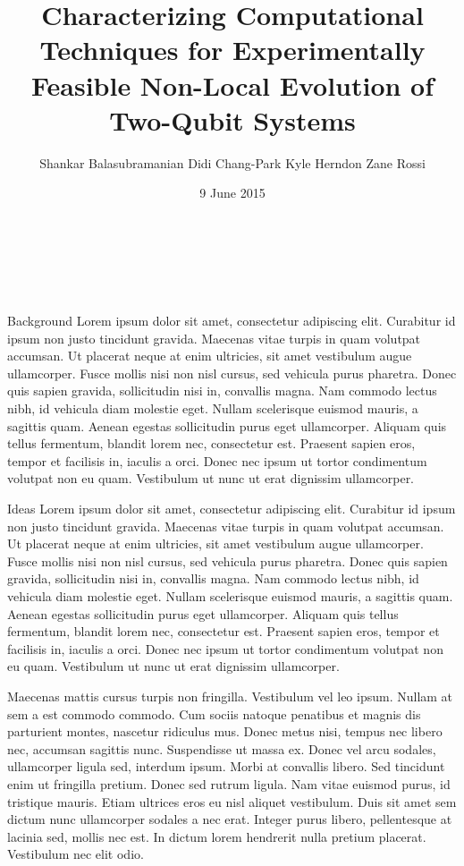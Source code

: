 \documentclass[12pt]{beamer}
\title{Characterizing Computational Techniques for Experimentally Feasible Non-Local Evolution of Two-Qubit Systems}
\author{Shankar Balasubramanian\hspace{1em} Didi Chang-Park\hspace{1em} Kyle Herndon\hspace{1em} Zane Rossi}
\institute{TJHSST Modern Physics and Optics Lab}
\date{9 June 2015}
\renewcommand{\maketitle}{%
	\begin{center}%
		\Huge\inserttitle\\[5mm]%
		\Large\insertauthor\\[5mm]%
		\Large\insertinstitute%
	\end{center}%
	\vspace*{-1ex}%
}
\begin{document}
\centering
	\begin{frame}{\maketitle}
		\begin{columns}
			\begin{column}{.45\textwidth}
				\begin{exampleblock}{Background}
					Lorem ipsum dolor sit amet, consectetur adipiscing elit. Curabitur id ipsum non justo tincidunt gravida. Maecenas vitae turpis in quam volutpat accumsan. Ut placerat neque at enim ultricies, sit amet vestibulum augue ullamcorper. Fusce mollis nisi non nisl cursus, sed vehicula purus pharetra. Donec quis sapien gravida, sollicitudin nisi in, convallis magna. Nam commodo lectus nibh, id vehicula diam molestie eget. Nullam scelerisque euismod mauris, a sagittis quam. Aenean egestas sollicitudin purus eget ullamcorper. Aliquam quis tellus fermentum, blandit lorem nec, consectetur est. Praesent sapien eros, tempor et facilisis in, iaculis a orci. Donec nec ipsum ut tortor condimentum volutpat non eu quam. Vestibulum ut nunc ut erat dignissim ullamcorper.
				\end{exampleblock}
				\vspace{1em}
				\begin{block}{Ideas}
					Lorem ipsum dolor sit amet, consectetur adipiscing elit. Curabitur id ipsum non justo tincidunt gravida. Maecenas vitae turpis in quam volutpat accumsan. Ut placerat neque at enim ultricies, sit amet vestibulum augue ullamcorper. Fusce mollis nisi non nisl cursus, sed vehicula purus pharetra. Donec quis sapien gravida, sollicitudin nisi in, convallis magna. Nam commodo lectus nibh, id vehicula diam molestie eget. Nullam scelerisque euismod mauris, a sagittis quam. Aenean egestas sollicitudin purus eget ullamcorper. Aliquam quis tellus fermentum, blandit lorem nec, consectetur est. Praesent sapien eros, tempor et facilisis in, iaculis a orci. Donec nec ipsum ut tortor condimentum volutpat non eu quam. Vestibulum ut nunc ut erat dignissim ullamcorper.

					Maecenas mattis cursus turpis non fringilla. Vestibulum vel leo ipsum. Nullam at sem a est commodo commodo. Cum sociis natoque penatibus et magnis dis parturient montes, nascetur ridiculus mus. Donec metus nisi, tempus nec libero nec, accumsan sagittis nunc. Suspendisse ut massa ex. Donec vel arcu sodales, ullamcorper ligula sed, interdum ipsum. Morbi at convallis libero. Sed tincidunt enim ut fringilla pretium. Donec sed rutrum ligula. Nam vitae euismod purus, id tristique mauris. Etiam ultrices eros eu nisl aliquet vestibulum. Duis sit amet sem dictum nunc ullamcorper sodales a nec erat. Integer purus libero, pellentesque at lacinia sed, mollis nec est. In dictum lorem hendrerit nulla pretium placerat. Vestibulum nec elit odio.


\end{block}
\end{column}
\end{columns}
\end{frame}
\end{document}
